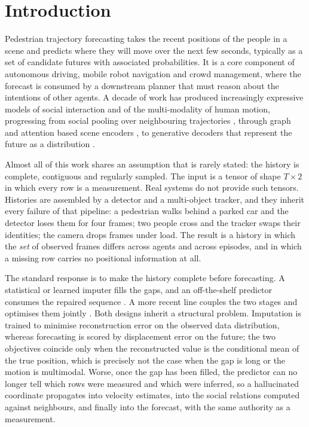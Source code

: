 \section{Introduction}
\label{sec:intro}

Pedestrian trajectory forecasting takes the recent positions of the people in a scene and predicts where they will move over the next few seconds, typically as a set of candidate futures with associated probabilities. It is a core component of autonomous driving, mobile robot navigation and crowd management, where the forecast is consumed by a downstream planner that must reason about the intentions of other agents. A decade of work has produced increasingly expressive models of social interaction and of the multi-modality of human motion, progressing from social pooling over neighbouring trajectories \cite{alahi2016social,gupta2018social}, through graph and attention based scene encoders \cite{mohamed2020social,yuan2021agentformer,liang2020lane,gao2020vectornet}, to generative decoders that represent the future as a distribution \cite{mangalam2020not,salzmann2020trajectron,fu2025moflow,zhang2024demo}.

Almost all of this work shares an assumption that is rarely stated: the history is complete, contiguous and regularly sampled. The input is a tensor of shape $T\times 2$ in which every row is a measurement. Real systems do not provide such tensors. Histories are assembled by a detector and a multi-object tracker, and they inherit every failure of that pipeline: a pedestrian walks behind a parked car and the detector loses them for four frames; two people cross and the tracker swaps their identities; the camera drops frames under load. The result is a history in which the \emph{set} of observed frames differs across agents and across episodes, and in which a missing row carries no positional information at all.

The standard response is to make the history complete before forecasting. A statistical or learned imputer fills the gaps, and an off-the-shelf predictor consumes the repaired sequence \cite{chib2024pedestrian,xu2023uncovering}. A more recent line couples the two stages and optimises them jointly \cite{chib2024mstip,chib2026hypergraph,sun2025rmpyolo}. Both designs inherit a structural problem. Imputation is trained to minimise reconstruction error on the observed data distribution, whereas forecasting is scored by displacement error on the future; the two objectives coincide only when the reconstructed value is the conditional mean of the true position, which is precisely not the case when the gap is long or the motion is multimodal. Worse, once the gap has been filled, the predictor can no longer tell which rows were measured and which were inferred, so a hallucinated coordinate propagates into velocity estimates, into the social relations computed against neighbours, and finally into the forecast, with the same authority as a measurement.

